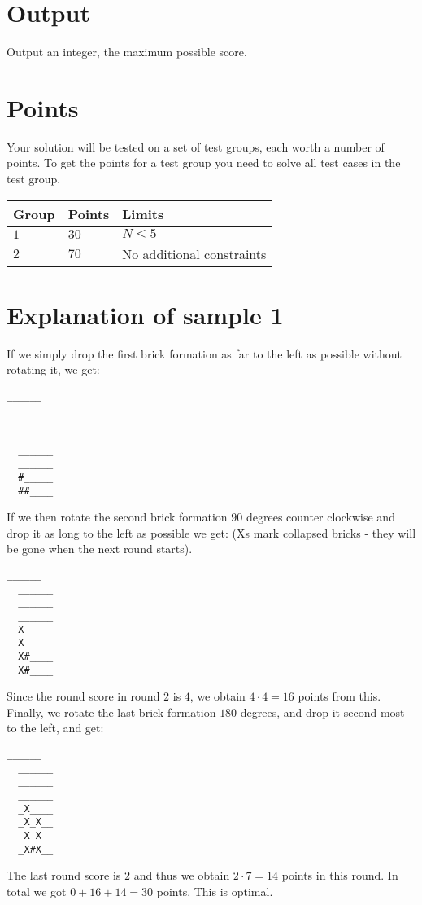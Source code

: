 \section*{Output}
\noindent
Output an integer, the maximum possible score.

\section*{Points}
\noindent
Your solution will be tested on a set of test groups, each worth a number of points.
To get the points for a test group you need to solve all test cases in the test group.

\noindent
\begin{tabular}{| l | l | p{12cm} |}
  \hline
  Group & Points & Limits \\ \hline
  $1$    & $30$       &  $N \leq 5$  \\ \hline 
  $2$    & $70$       &  No additional constraints \\ \hline
\end{tabular}

\section*{Explanation of sample 1}
\noindent
If we simply drop the first brick formation as far to the left as possible without rotating it, we
get:

\noindent
\begin{lstlisting}[basicstyle=\ttfamily]
  ______
  ______
  ______
  ______
  ______
  ______
  #_____
  ##____
\end{lstlisting}

If we then rotate the second brick formation $90$ degrees counter clockwise and drop it as
long to the left as possible we get: (Xs mark collapsed bricks - they will be gone when the
next round starts).

\noindent
\begin{lstlisting}[basicstyle=\ttfamily]
  ______
  ______
  ______
  ______
  X_____
  X_____
  X#____
  X#____
\end{lstlisting}

Since the round score in round $2$ is $4$, we obtain $4 \cdot 4 = 16$ points from this. Finally, we rotate
the last brick formation $180$ degrees, and drop it second most to the left, and get:

\noindent
\begin{lstlisting}[basicstyle=\ttfamily]
  ______
  ______
  ______
  ______
  _X____
  _X_X__
  _X_X__
  _X#X__
\end{lstlisting}

The last round score is $2$ and thus we obtain $2 \cdot 7 = 14$ points in this round. In total we got
$0 + 16 + 14 = 30$ points. This is optimal.